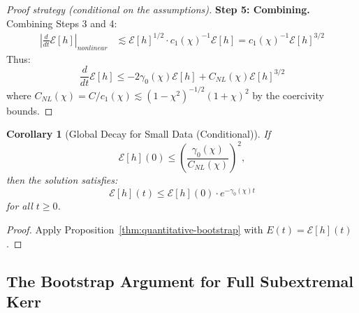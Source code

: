 \documentclass[12pt,a4paper]{article}
\newtheorem{corollary}[theorem]{Corollary}
\begin{document}
\begin{proof}[Proof strategy (conditional on the assumptions)]
\textbf{Step 5: Combining.}
Combining Steps 3 and 4:
\begin{align}
\left|\frac{d}{dt}\mathcal{E}[h]\right|_{nonlinear} &\lesssim \mathcal{E}[h]^{1/2} \cdot c_1(\chi)^{-1} \mathcal{E}[h] = c_1(\chi)^{-1} \mathcal{E}[h]^{3/2}
\end{align}
Thus:
\begin{equation}
\frac{d}{dt}\mathcal{E}[h] \leq -2\gamma_0(\chi)\mathcal{E}[h] + C_{NL}(\chi) \mathcal{E}[h]^{3/2}
\end{equation}
where $C_{NL}(\chi) = C/c_1(\chi) \lesssim (1-\chi^2)^{-1/2}(1+\chi)^2$ by the coercivity bounds.
\end{proof}

\begin{corollary}[Global Decay for Small Data (Conditional)]\label{cor:global-decay}
If
\begin{equation}
\mathcal{E}[h](0) \le \left(\frac{\gamma_0(\chi)}{C_{NL}(\chi)}\right)^2,
\end{equation}
then the solution satisfies:
\begin{equation}
\mathcal{E}[h](t) \leq \mathcal{E}[h](0) \cdot e^{-\gamma_0(\chi) t}
\end{equation}
for all $t \geq 0$.
\end{corollary}

\begin{proof}
Apply Proposition~\ref{thm:quantitative-bootstrap} with $E(t)=\mathcal{E}[h](t)$.
\end{proof}

\subsection{The Bootstrap Argument for Full Subextremal Kerr}\label{subsec:bootstrap-hierarchy}
\end{document}
